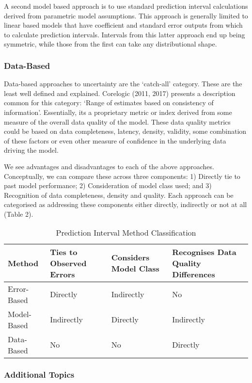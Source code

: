 \documentclass[colTwo]{format}
\theoremstyle{definition}
\begin{document}
A second model based approach is to use standard prediction interval calculations derived from parametric model assumptions.  This approach is generally limited to linear based models that have coefficient and standard error outputs from which to calculate prediction intervals.  Intervals from this latter approach end up being symmetric, while those from the first can take any distributional shape. 

\subsubsection{Data-Based}

Data-based approaches to uncertainty are the ‘catch-all’ category.  These are the least well defined and explained.  Corelogic (2011, 2017) presents a description common for this category: ‘Range of estimates based on consistency of information’.  Essentially, its a proprietary metric or index derived from some measure of the overall data quality of the model.  These data quality metrics could be based on data completeness, latency, density, validity, some combination of these factors or even other measure of confidence in the underlying data driving the model.  

We see advantages and disadvantages to each of the above approaches.   Conceptually, we can compare these across three components: 1) Directly tie to past model performance; 2) Consideration of model class used; and 3) Recognition of data completeness, density and quality.  Each approach can be categorised as addressing these components either directly, indirectly or not at all (Table 2).  

\begin{table}[h!]
\centering
\begin{tabular}{|p{1.2cm} | p{1.6cm} | p{1.6cm} | p{1.6cm} |} 
 \hline
  \textbf{Method} & \textbf{Ties to Observed Errors} & \textbf{Considers Model Class} & \textbf{Recognises Data Quality Differences} \\ [0.5ex] 
 \hline
 Error-Based & Directly & Indirectly & No \\ 
 \hline
 Model-Based & Indirectly & Directly & Indirectly \\
 \hline
 Data-Based & No & No & Directly \\
 \hline
\end{tabular}
\caption{Prediction Interval Method Classification}
\label{table:2}
\end{table}

\subsubsection{Additional Topics}
\end{document}
